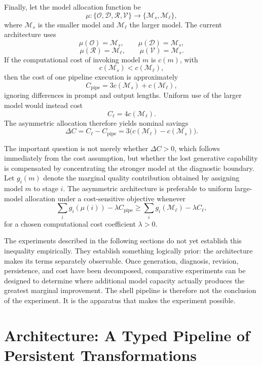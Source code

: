 \documentclass[11pt]{article}
\newcommand{\Draft}{\mathcal{D}}
\newcommand{\Review}{\mathcal{R}}
\newcommand{\Revise}{\mathcal{V}}
\newcommand{\Outline}{\mathcal{O}}
\newcommand{\Model}{\mathcal{M}}
\begin{document}
Finally, let the model allocation function be
\[
    \mu:
    \{\Outline,\Draft,\Review,\Revise\}
    \rightarrow
    \{\Model_s,\Model_\ell\},
\]
where \(\Model_s\) is the smaller model and \(\Model_\ell\) the larger model. The current architecture uses
\[
    \mu(\Outline)=\Model_s,
    \qquad
    \mu(\Draft)=\Model_s,
\]
\[
    \mu(\Review)=\Model_\ell,
    \qquad
    \mu(\Revise)=\Model_s.
\]
If the computational cost of invoking model \(m\) is \(c(m)\), with
\[
    c(\Model_s)<c(\Model_\ell),
\]
then the cost of one pipeline execution is approximately
\[
    C_{\mathrm{pipe}}
    =
    3c(\Model_s)+c(\Model_\ell),
\]
ignoring differences in prompt and output lengths. Uniform use of the larger model would instead cost
\[
    C_{\ell}=4c(\Model_\ell).
\]
The asymmetric allocation therefore yields nominal savings
\[
    \Delta C
    =
    C_{\ell}-C_{\mathrm{pipe}}
    =
    3\bigl(c(\Model_\ell)-c(\Model_s)\bigr).
\]

The important question is not merely whether \(\Delta C>0\), which follows immediately from the cost assumption, but whether the lost generative capability is compensated by concentrating the stronger model at the diagnostic boundary. Let \(g_i(m)\) denote the marginal quality contribution obtained by assigning model \(m\) to stage \(i\). The asymmetric architecture is preferable to uniform large-model allocation under a cost-sensitive objective whenever
\[
    \sum_i g_i(\mu(i))
    -
    \lambda C_{\mathrm{pipe}}
    \geq
    \sum_i g_i(\Model_\ell)
    -
    \lambda C_{\ell},
\]
for a chosen computational cost coefficient \(\lambda>0\).

The experiments described in the following sections do not yet establish this inequality empirically. They establish something logically prior: the architecture makes its terms separately observable. Once generation, diagnosis, revision, persistence, and cost have been decomposed, comparative experiments can be designed to determine where additional model capacity actually produces the greatest marginal improvement. The shell pipeline is therefore not the conclusion of the experiment. It is the apparatus that makes the experiment possible.

\section{Architecture: A Typed Pipeline of Persistent Transformations}
\end{document}
